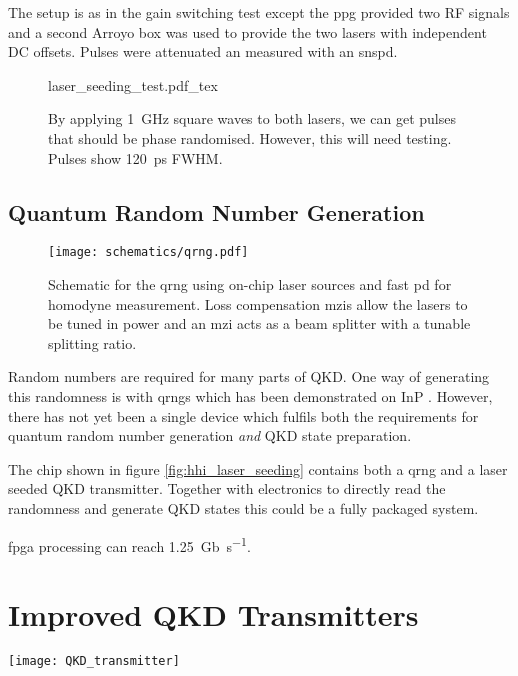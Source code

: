 The setup is as in the gain switching test except the \ac{ppg} provided two RF signals and a second Arroyo box was used to provide the two lasers with independent DC offsets. Pulses were attenuated an measured with an \ac{snspd}. 

\begin{figure}[tp]
	\centering	
	\def\svgwidth{0.9\textwidth} 
	{laser_seeding_test.pdf_tex}
	\caption[Integrated laser seeding test]{By applying \SI{1}{GHz} square waves to both lasers, we can get pulses that should be phase randomised. However,  this will need testing. Pulses show \SI{120}{ps} \ac{FWHM}.}
	\label{fig:las_seed_test}
\end{figure}

\subsection{Quantum Random Number Generation}
\label{sec:hhi_qrng}

\begin{figure}[t]
	\centering
	\texttt{[image: schematics/qrng.pdf]}
	\caption[Schematic for InP quantum random number generation]{Schematic for the \ac{qrng} using on-chip laser sources and fast \ac{pd} for homodyne measurement. Loss compensation \acp{mzi} allow the lasers to be tuned in power and an \ac{mzi} acts as a beam splitter with a tunable splitting ratio.}
\end{figure}

Random numbers are required for many parts of \ac{QKD}. One way of generating this randomness is with \acp{qrng} which has been demonstrated on \ac{InP} \cite{FrancescoThesis, Abellan2016}. However, there has not yet been a single device which fulfils both the requirements for quantum random number generation \textit{and} \ac{QKD} state preparation.

The chip shown in figure \ref{fig:hhi_laser_seeding} contains both a \ac{qrng} and a laser seeded \ac{QKD} transmitter. Together with electronics to directly read the randomness and generate \ac{QKD} states this could be a fully packaged system.

\Ac{fpga} processing can reach \SI{1.25}{Gb\per\second}.

\section{Improved QKD Transmitters}

\begin{sidewaysfigure}
	\centering
	\texttt{[image: QKD\_transmitter]}
	\caption[Layout of latest generation InP QKD Transmitter]{Latest generation \ac{InP} transmitter fabricated by Fraunhofer HHI. The \SI{6x4}{mm} chip contains three ways to create BB84 states for \ac{QKD}. The optical components are shown in blue, while the electrical connects are in red. Light created with on-chip lasers and manipulated with \acp{cipm} and \ac{topm}. States are coupled off the chip through \acp{ssc} into fibre.}
	\label{fig:hhi_gds}
\end{sidewaysfigure}


